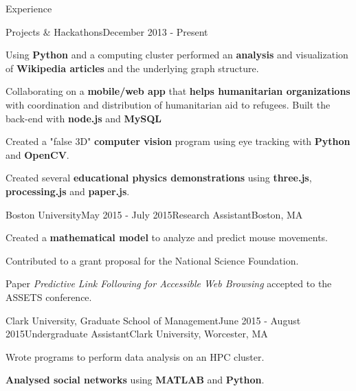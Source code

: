 \documentclass{resume} %
\begin{document}
\begin{rSection}{Experience}


\begin{rSubsection}{Projects \& Hackathons}{December 2013 - Present}{}{}
\item Using \textcolor{mygray}{\textbf{Python}} and a computing cluster performed an \textcolor{mygray}{\textbf{analysis}} and visualization of \textcolor{mygray}{\textbf{Wikipedia \mbox articles}} and the underlying graph structure.
\item Collaborating on a \textcolor{mygray}{\textbf{mobile/web app}} that \textcolor{mygray}{\textbf{helps humanitarian organizations}} with coordination and distribution of humanitarian aid to refugees. Built the back-end with \textcolor{mygray}{\textbf{node.js}} and \textcolor{mygray}{\textbf{MySQL}}
\item Created a "false 3D" \textcolor{mygray}{\textbf{computer vision}} program using eye tracking with \textcolor{mygray}{\textbf{Python}} and \textcolor{mygray}{\textbf{OpenCV}}.
\item Created several \textcolor{mygray}{\textbf{educational physics demonstrations}} using \textcolor{mygray}{\textbf{three.js}}, \textcolor{mygray}{\textbf{processing.js}} and \textcolor{mygray}{\textbf{paper.js}}.
\end{rSubsection}


\begin{rSubsection}{Boston University}{May 2015 - July 2015}{Research Assistant}{Boston, MA}
\item Created a \textcolor{mygray}{\textbf{mathematical model}} to analyze and predict mouse movements.
\item Contributed to a grant proposal for the National Science Foundation.
\item Paper \emph{Predictive Link Following for Accessible Web Browsing} accepted to the ASSETS conference.
\end{rSubsection}


\begin{rSubsection}{Clark University, Graduate School of Management}{June 2015 - August 2015}{Undergraduate Assistant}{Clark University, Worcester, MA}
\item Wrote programs to perform data analysis on an HPC cluster.
\item \textcolor{mygray}{\textbf{Analysed social networks}} using \textcolor{mygray}{\textbf{MATLAB}} and \textcolor{mygray}{\textbf{Python}}.
\end{rSubsection}


\end{rSection}
\end{document}
